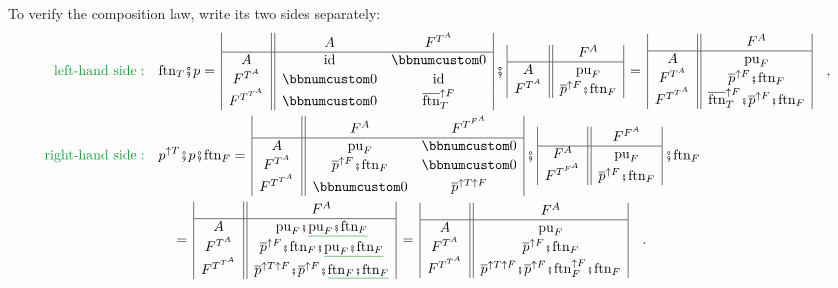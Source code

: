 To verify the composition law, write its two sides separately:
\begin{align*}
{\color{greenunder}\text{left-hand side}:}\quad & \text{ftn}_{T}\bef p=\,\begin{array}{|c||cc|}
 & A & F^{T^{A}}\\
\hline A & \text{id} & \bbnum 0\\
F^{T^{A}} & \bbnum 0 & \text{id}\\
F^{T^{T^{A}}} & \bbnum 0 & \overline{\text{ftn}}_{T}^{\uparrow F}
\end{array}\,\bef\,\begin{array}{|c||c|}
 & F^{A}\\
\hline A & \text{pu}_{F}\\
F^{T^{A}} & \overline{p}^{\uparrow F}\bef\text{ftn}_{F}
\end{array}\,=\,\begin{array}{|c||c|}
 & F^{A}\\
\hline A & \text{pu}_{F}\\
F^{T^{A}} & \overline{p}^{\uparrow F}\bef\text{ftn}_{F}\\
F^{T^{T^{A}}} & \overline{\text{ftn}}_{T}^{\uparrow F}\bef\overline{p}^{\uparrow F}\bef\text{ftn}_{F}
\end{array}\quad,\\
{\color{greenunder}\text{right-hand side}:}\quad & p^{\uparrow T}\bef p\bef\text{ftn}_{F}=\,\begin{array}{|c||cc|}
 & F^{A} & F^{T^{F^{A}}}\\
\hline A & \text{pu}_{F} & \bbnum 0\\
F^{T^{A}} & \overline{p}^{\uparrow F}\bef\text{ftn}_{F} & \bbnum 0\\
F^{T^{T^{A}}} & \bbnum 0 & \overline{p}^{\uparrow T\uparrow F}
\end{array}\,\bef\,\begin{array}{|c||c|}
 & F^{F^{A}}\\
\hline F^{A} & \text{pu}_{F}\\
F^{T^{F^{A}}} & \overline{p}^{\uparrow F}\bef\text{ftn}_{F}
\end{array}\,\bef\text{ftn}_{F}\\
 & \quad=\,\begin{array}{|c||c|}
 & F^{A}\\
\hline A & \text{pu}_{F}\bef\gunderline{\text{pu}_{F}\bef\text{ftn}_{F}}\\
F^{T^{A}} & \overline{p}^{\uparrow F}\bef\text{ftn}_{F}\bef\gunderline{\text{pu}_{F}\bef\text{ftn}_{F}}\\
F^{T^{T^{A}}} & \overline{p}^{\uparrow T\uparrow F}\bef\overline{p}^{\uparrow F}\bef\gunderline{\text{ftn}_{F}\bef\text{ftn}_{F}}
\end{array}\,=\,\begin{array}{|c||c|}
 & F^{A}\\
\hline A & \text{pu}_{F}\\
F^{T^{A}} & \overline{p}^{\uparrow F}\bef\text{ftn}_{F}\\
F^{T^{T^{A}}} & \overline{p}^{\uparrow T\uparrow F}\bef\overline{p}^{\uparrow F}\bef\text{ftn}_{F}^{\uparrow F}\bef\text{ftn}_{F}
\end{array}\quad.
\end{align*}
